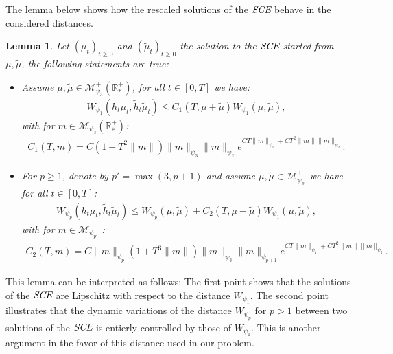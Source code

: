\documentclass[11pt,a4paper]{article}
\newcommand{\RRP}{\mathbb{R}^+_*}
\newcommand{\MC}{\mathcal{M}}
\newcommand{\SCE}{\emph{SCE}}
\newcommand{\Proc}[1]{\left(#1\right)_{t\geq 0}}
\newtheorem{lemma}[theorem]{Lemma}
\begin{document}
The lemma below shows how the rescaled solutions of the $\SCE$ behave in the considered distances.
\begin{lemma}\label{lem:wass-rescaled-SCE}
    Let $\Proc{\mu_t}$ and $\Proc{\tilde{\mu}_t}$ the solution to the $\SCE$ started from $\mu, \tilde{\mu}$, the following statements are true:
    \begin{itemize}
        \item Assume $\mu, \tilde{\mu} \in \MC^+_{\psi_3}(\RRP)$, for all $t \in [0,T]$ we have:
            \begin{align*}
                W_{\psi_1} \left(h_t\mu_t ,\tilde{h}_t\tilde{\mu}_t\right) \leq  C_1(T,\mu + \tilde{\mu})W_{\psi_1}(\mu,\tilde{\mu}),
            \end{align*}
            with for $m \in \MC_{\psi_3}(\RRP)$:
            \begin{align*}
                C_1(T,m) = C\left( 1 + T^2\|m\|\right)\|m\|_{\psi_3} \|m\|_{\psi_{2}}e^{CT \|m\|_{\psi_1} + CT^2\|m\|\|m\|_{\psi_2}}.
            \end{align*}
        \item For $p \geq 1$, denote by $p' = \max(3,p+1)$ and assume $\mu, \tilde{\mu} \in \MC^+_{\psi_{p'}}$ we have for all $t \in [0,T]$:
            \begin{align*}
                W_{\psi_p} \left(h_t\mu_t ,\tilde{h}_t\tilde{\mu}_t\right) \leq W_{\psi_p}(\mu,\tilde{\mu}) + C_2(T,\mu + \tilde{\mu})W_{\psi_1}(\mu,\tilde{\mu}),
            \end{align*}
            with for $m \in \MC_{\psi_{p'}}$ :
            \begin{align*}
                C_2(T,m) = C\|m\|_{\psi_p}\left( 1 + T^3\|m\|\right)\|m\|_{\psi_3} \|m\|_{\psi_{p+1}}e^{CT \|m\|_{\psi_1} + CT^2\|m\|\|m\|_{\psi_2}}.
            \end{align*}
    \end{itemize}
\end{lemma}
This lemma can be interpreted as follows: The first point shows that the solutions of the $\SCE$ are Lipschitz with respect to the distance $W_{\psi_1}$. The second point illustrates that the dynamic variations of the distance $W_{\psi_p}$ for $p > 1$ between two solutions of the $\SCE$ is entierly controlled by those of $W_{\psi_1}$. This is another argument in the favor of this distance used in our problem.
\end{document}

